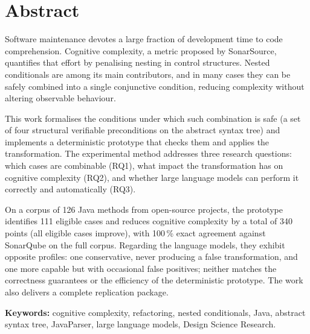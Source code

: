 \chapter*{Abstract}

Software maintenance devotes a large fraction of development time to code
comprehension. Cognitive complexity, a metric proposed by SonarSource, quantifies
that effort by penalising nesting in control structures. Nested conditionals are
among its main contributors, and in many cases they can be safely combined into a
single conjunctive condition, reducing complexity without altering observable
behaviour.

This work formalises the conditions under which such combination is safe (a set
of four structural verifiable preconditions on the abstract syntax tree) and implements a
deterministic prototype that checks them and applies the transformation. The
experimental method addresses three research questions: which cases are
combinable (RQ1), what impact the transformation has on cognitive complexity
(RQ2), and whether large language models can perform it correctly and
automatically (RQ3).

On a corpus of 126 Java methods from open-source projects, the prototype
identifies 111 eligible cases and reduces cognitive complexity by a total of 340
points (all eligible cases improve), with 100\,\% exact agreement against
SonarQube on the full corpus. Regarding the language models, they exhibit
opposite profiles: one conservative, never producing a false transformation, and
one more capable but with occasional false positives; neither matches the
correctness guarantees or the efficiency of the deterministic prototype. The work
also delivers a complete replication package.

\vspace{1em}
\noindent\textbf{Keywords:} cognitive complexity, refactoring, nested
conditionals, Java, abstract syntax tree, JavaParser, large language models,
Design Science Research.
